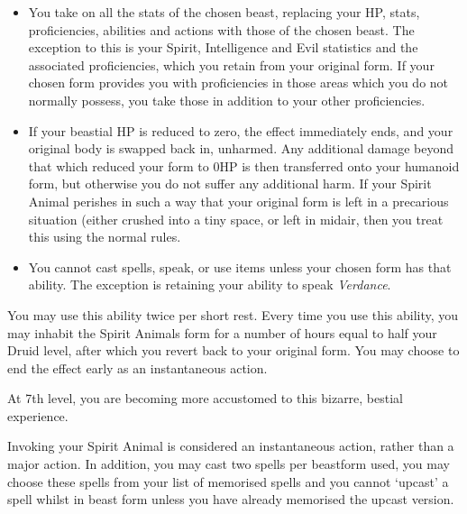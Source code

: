 {\begin{itemize}[itemsep = 0cm]
\begin{itemize}[itemsep = 0cm]
\begin{center}
						\begin{rndtable}{p{1.2cm} c p{4.3cm} }
							\bf Level	&	\bf Rating	&	\bf	Example \\
						\end{rndtable}
					\end{center}
			\end{itemize}
		\item You take on all the stats of the chosen beast, replacing your HP, stats, proficiencies, abilities and actions with those of the chosen beast. The exception to this is your Spirit, Intelligence and Evil statistics and the associated proficiencies, which you retain from your original form. If your chosen form provides you with proficiencies in those areas which you do not normally possess, you take those in addition to your other proficiencies. 
		\item If your beastial HP is reduced to zero, the effect immediately ends, and your original body is swapped back in, unharmed. Any additional damage beyond that which reduced your form to 0HP is then transferred onto your humanoid form, but otherwise you do not suffer any additional harm. If your Spirit Animal perishes in such a way that your original form is left in a precarious situation (either crushed into a tiny space, or left in mid\minus{}air, then you treat this using the normal rules. 
		\item You cannot cast spells, speak, or use items unless your chosen form has that ability. The exception is retaining your ability to speak {\it Verdance}.
	\end{itemize}
	
	You may use this ability twice per short rest. Every time you use this ability, you may inhabit the Spirit Animal\apos{}s form for a number of hours equal to half your Druid level, after which you revert back to your original form. You may choose to end the effect early as an instantaneous action.
}
{
	At 7th level, you are becoming more accustomed to this bizarre, bestial experience. 
	
	Invoking your Spirit Animal is considered an instantaneous action, rather than a major action. In addition, you may cast two spells per beast\minus{}form used, you may choose these spells from your list of memorised spells \minus{} and you cannot `upcast' a spell whilst in beast form unless you have already memorised the upcast version. 
}

